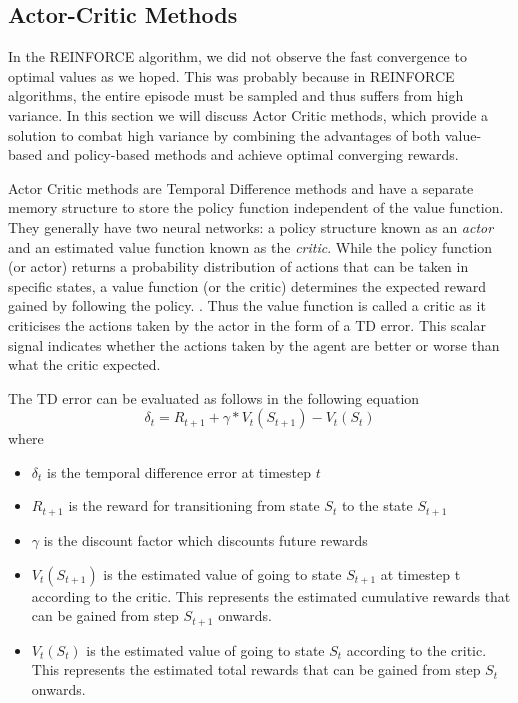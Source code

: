 \documentclass{article}
\begin{document}
\subsection{Actor-Critic Methods}
\par In the REINFORCE algorithm, we did not observe the fast convergence to optimal values as we hoped. This was probably because in REINFORCE algorithms, the entire episode must be sampled and thus suffers from high variance. In this section we will discuss Actor Critic methods, which provide a solution to combat high variance by combining the advantages of both value-based and policy-based methods and achieve optimal converging rewards. 
\par Actor Critic methods are Temporal Difference methods and have a separate memory structure to store the policy function independent of the value function. They generally have two neural networks: a policy structure known as an \emph{actor} and an estimated value function known as the \emph{critic}. While the policy function (or actor) returns a probability distribution of actions that can be taken in specific states, a value function (or the critic) determines the expected reward gained by following the policy. \cite{actor-critic}. Thus the value function is called a critic as it criticises the actions taken by the actor in the form of a TD error. This scalar signal indicates whether the actions taken by the agent are better or worse than what the critic expected. 
\par The TD error can be evaluated as follows in the following equation
\begin{equation*}
\delta_{t} = R_{t+1} + \gamma * V_t(S_{t+1})-V_t(S_t)
\end{equation*}
 where 
\begin{itemize}[itemsep=0.0pt]
\renewcommand\labelitemi{.}
\item $\delta_{t}$ is the temporal difference error at timestep $t$
\item $R_{t+1}$ is the reward for transitioning from state $S_t$ to the state $S_{t+1}$
\item $\gamma$ is the discount factor which discounts future rewards
\item $V_t(S_{t+1})$ is the estimated value of going to state $S_{t+1}$ at timestep t according to the critic. This represents the estimated cumulative rewards that can be gained from step $S_{t+1}$ onwards.
\item $V_t(S_t)$ is the estimated value of going to state $S_t$ according to the critic. This represents the estimated total rewards that can be gained from step $S_{t}$ onwards.
\end{itemize}
\end{document}
